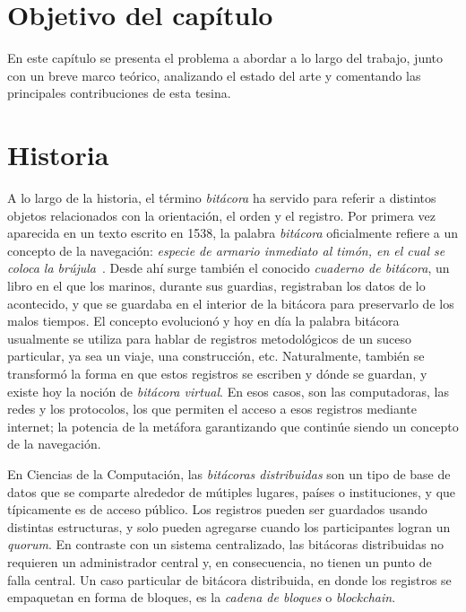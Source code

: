 \section{Objetivo del capítulo}
En este capítulo se presenta el problema a abordar a lo largo del trabajo, junto con un breve
marco teórico, analizando el estado del arte y comentando las principales contribuciones de esta
tesina.

\section{Historia}


A lo largo de la historia, el término \textit{bitácora} ha servido para referir a
distintos objetos relacionados con la orientación, el orden y el registro. Por
primera vez aparecida en un texto escrito en 1538,
la palabra \textit{bitácora}
oficialmente refiere a un concepto de la navegación: \textit{especie de armario
inmediato al timón, en el cual se coloca la brújula}~\cite{dic.Etimologico}.
Desde ahí surge también
el conocido \textit{cuaderno de bitácora}, un libro en el que los marinos, durante
sus guardias, registraban los datos de lo acontecido, y que se guardaba en el
interior de la bitácora para preservarlo de los malos tiempos. El concepto
evolucionó y hoy en día la palabra bitácora usualmente se utiliza para hablar
de registros metodológicos de un suceso particular, ya sea un viaje, una
construcción, etc. Naturalmente, también se transformó la forma en que estos
registros se escriben y dónde se guardan, y existe hoy la noción de \textit{bitácora
virtual}. En esos casos, son las computadoras, las redes y los protocolos,
los que permiten el acceso a esos registros mediante internet; la potencia de la
metáfora garantizando que continúe siendo un concepto de la navegación.
%

En Ciencias de la Computación, las \textit{bitácoras distribuidas} son un tipo de
base de datos que se comparte
alrededor de mútiples lugares, países o instituciones, y que típicamente es de
acceso público. Los registros pueden ser guardados usando distintas estructuras,
y solo pueden agregarse cuando los participantes logran un \textit{quorum}. En
contraste con un sistema centralizado, las bitácoras distribuidas no requieren
un administrador central y, en consecuencia, no tienen un punto de falla central.
Un caso particular de bitácora distribuida, en donde los registros se empaquetan
en forma de bloques, es la \textit{cadena de bloques} o \textit{blockchain}.

